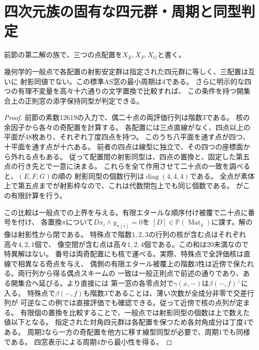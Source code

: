 \section{四次元族の固有な四元群・周期と同型判定}
\label{sec:klein-generic-isomorphisms}
前節の第二解の族で、三つの点配置を$X_E,X_F,X_G$と書く。

\begin{theorem}\label{thm:klein-generic-period-four}
幾何学的一般点で各配置の射影安定群は指定された四元群に等しく、三配置は互いに
射影同値でない。この標準AS窓の最小周期は4である。
さらに明示的な四つの有理不変量を高々十六通りの文字置換で比較すれば、
この条件を持つ開集合上の正則窓の添字保持同型が判定できる。
\end{theorem}
\begin{proof}
前節の素数12619の入力で、偶二十点の両評価行列は階数3である。
核の余因子から各々の奇配置を計算する。
各配置には三点直線がなく、四点以上の平面が48枚あり、それぞれ丁度四点を持つ。
このうち八平面を通す点が四つ、十平面を通す点が十六ある。
前者の四点は線型に独立で、その四つの座標面から外れる点もある。
従って配置間の射影同型は、四点の置換と、固定した第五点の行き先とで一意に決まる。
これらを全て作用させて二十点の一致を調べると、$(E,F,G)$の順の
射影同型の個数行列は$\operatorname{diag}(4,4,4)$である。
全点が素体上で第五点までが射影枠なので、これは代数閉包上でも同じ個数である。
がこの有限計算を行う。

この比較は一般点での上界を与える。有限エタールな順序付け被覆で二十点に番号を付け、
各置換$\pi$について$D x_i\wedge y_{\pi(i)}=0$を
$[D]\in\mathbb P(\operatorname{Mat}_4)$に課す。解の像は射影性から閉である。
特殊点で階数$1,2,3$の行列の核が含む点はそれぞれ高々$4,2,1$個で、
像空間が含む点は高々$1,2,4$個である。この和は20未満なので特異解はない。
番号は両奇配置にも核で運べる。実際、特殊点で全評価核は直線で相異なる奇点を与え、
偶側の有限エタール被覆上の階数3性は近傍で保たれる。両行列から得る偶点スキームの
一致は一般正則点で前述の通りであり、ある開集合へ延びる。より直接には
第一窓の各零点対で$\gamma(x,-)$は$\beta(-,f)^\perp$に入る。
特殊点で$\beta(-,f)$も階数3であることは、薄い次数が全成分非零で交差行列が
可逆なこの例では直接評価でも確認できる。従って近傍で核の点列が定まる。
有限個の置換を比較することで、一般点では射影同型の個数は上で数えた値以下となる。
指定された対角四元群は各配置を保つため各対角成分は丁度4である。
周期2なら一方の奇配置を他方に移す線型同型が必要で、周期1でも同様である。
四窓表示による周期4から最小性を得る。


\end{proof}
